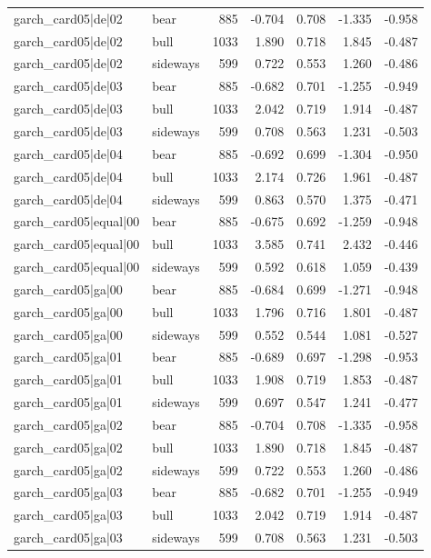\begin{table}
\begin{tabular}{llrrrrr}
garch\_card05|de|02 & bear & 885 & -0.704 & 0.708 & -1.335 & -0.958 \\
garch\_card05|de|02 & bull & 1033 & 1.890 & 0.718 & 1.845 & -0.487 \\
garch\_card05|de|02 & sideways & 599 & 0.722 & 0.553 & 1.260 & -0.486 \\
garch\_card05|de|03 & bear & 885 & -0.682 & 0.701 & -1.255 & -0.949 \\
garch\_card05|de|03 & bull & 1033 & 2.042 & 0.719 & 1.914 & -0.487 \\
garch\_card05|de|03 & sideways & 599 & 0.708 & 0.563 & 1.231 & -0.503 \\
garch\_card05|de|04 & bear & 885 & -0.692 & 0.699 & -1.304 & -0.950 \\
garch\_card05|de|04 & bull & 1033 & 2.174 & 0.726 & 1.961 & -0.487 \\
garch\_card05|de|04 & sideways & 599 & 0.863 & 0.570 & 1.375 & -0.471 \\
garch\_card05|equal|00 & bear & 885 & -0.675 & 0.692 & -1.259 & -0.948 \\
garch\_card05|equal|00 & bull & 1033 & 3.585 & 0.741 & 2.432 & -0.446 \\
garch\_card05|equal|00 & sideways & 599 & 0.592 & 0.618 & 1.059 & -0.439 \\
garch\_card05|ga|00 & bear & 885 & -0.684 & 0.699 & -1.271 & -0.948 \\
garch\_card05|ga|00 & bull & 1033 & 1.796 & 0.716 & 1.801 & -0.487 \\
garch\_card05|ga|00 & sideways & 599 & 0.552 & 0.544 & 1.081 & -0.527 \\
garch\_card05|ga|01 & bear & 885 & -0.689 & 0.697 & -1.298 & -0.953 \\
garch\_card05|ga|01 & bull & 1033 & 1.908 & 0.719 & 1.853 & -0.487 \\
garch\_card05|ga|01 & sideways & 599 & 0.697 & 0.547 & 1.241 & -0.477 \\
garch\_card05|ga|02 & bear & 885 & -0.704 & 0.708 & -1.335 & -0.958 \\
garch\_card05|ga|02 & bull & 1033 & 1.890 & 0.718 & 1.845 & -0.487 \\
garch\_card05|ga|02 & sideways & 599 & 0.722 & 0.553 & 1.260 & -0.486 \\
garch\_card05|ga|03 & bear & 885 & -0.682 & 0.701 & -1.255 & -0.949 \\
garch\_card05|ga|03 & bull & 1033 & 2.042 & 0.719 & 1.914 & -0.487 \\
garch\_card05|ga|03 & sideways & 599 & 0.708 & 0.563 & 1.231 & -0.503 \\

\end{tabular}
\end{table}
